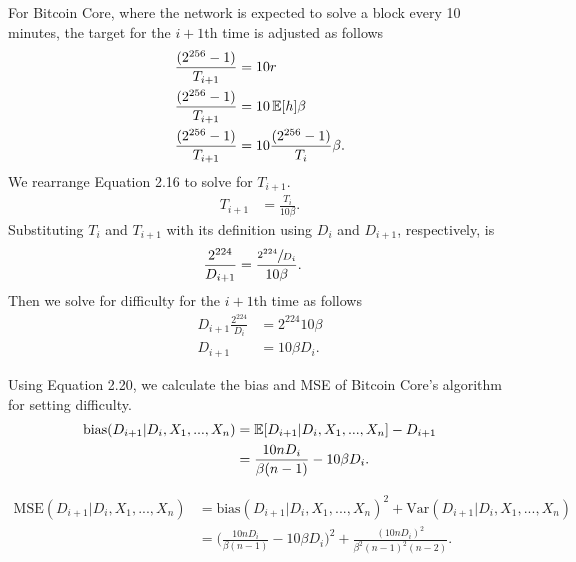 For Bitcoin Core, where the network is expected to solve a block every 10 minutes, the target for the $i+1$th time is adjusted as follows 
\begin{align}
\frac{(2^{256}-1)}{T_{i+1}} &= 10r \\
\frac{(2^{256}-1)}{T_{i+1}} &= 10\operatorname{\mathbb{E}}[h] \beta \\
\frac{(2^{256}-1)}{T_{i+1}} &= 10\frac{(2^{256}-1)}{T_i}\beta .
\end{align}
We rearrange Equation 2.16 to solve for $T_{i+1}$.
\begin{align}
T_{i+1} &= \frac{T_i}{10\beta}.
\end{align}
Substituting $T_i$ and $T_{i+1}$ with its definition using $D_i$ and $D_{i+1}$, respectively, is
\begin{align}
\frac{2^{224}}{D_{i+1}} &= \frac{\sfrac{2^{224}}{D_i}}{10\beta}.
\end{align}
Then we solve for difficulty for the $i+1$th time as follows 
\begin{align}
D_{i+1}\frac{2^{224}}{D_i} &= 2^{224}10\beta \\
D_{i+1} &= 10\beta D_i.
\end{align}

\noindent Using Equation 2.20, we calculate the bias and MSE of Bitcoin Core's algorithm for setting difficulty. \\
\begin{align}
\text{bias}(D_{i+1}|D_i,X_1,...,X_n) &= \operatorname{\mathbb{E}}[D_{i+1}|D_i,X_1,...,X_n] - D_{i+1} \\
&= \frac{10n D_i}{\beta(n-1)} - 10\beta D_i.
\end{align}

\begin{align}
\text{MSE}(D_{i+1}|D_i,X_1,...,X_n) &= \text{bias}(D_{i+1}|D_i,X_1,...,X_n)^2 + \text{Var}(D_{i+1}|D_i,X_1,...,X_n) \\
&= \Bigg(\frac{10n D_i}{\beta(n-1)} - 10\beta D_i\Bigg)^2 + \frac{(10n D_i)^2}{\beta^2(n-1)^2(n-2)}.
\end{align}

